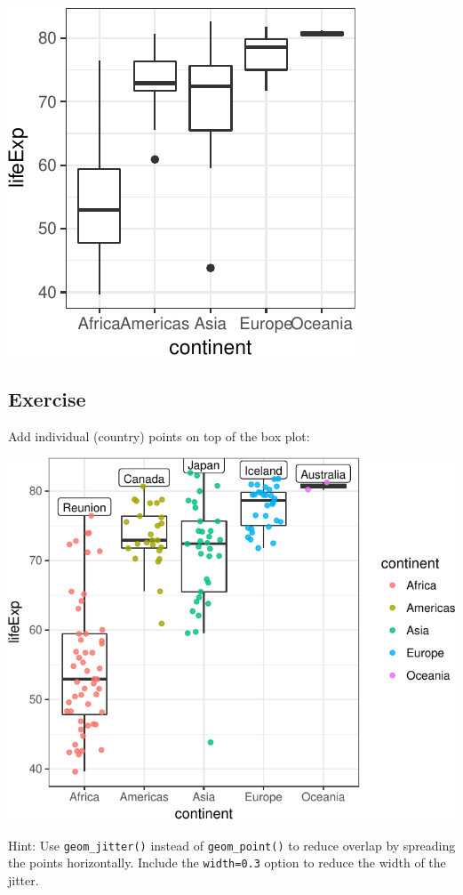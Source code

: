 \documentclass[12pt,]{krantz}
\theoremstyle{definition}
\theoremstyle{definition}
\theoremstyle{definition}
\theoremstyle{remark}
\begin{document}
\includegraphics{04_plotting_files/figure-latex/unnamed-chunk-9-1.pdf}

\hypertarget{exercise-20}{%
\subsection{Exercise}\label{exercise-20}}

Add individual (country) points on top of the box plot:

\includegraphics{04_plotting_files/figure-latex/unnamed-chunk-10-1.pdf}

Hint: Use \texttt{geom\_jitter()} instead of \texttt{geom\_point()} to
reduce overlap by spreading the points horizontally. Include the
\texttt{width=0.3} option to reduce the width of the jitter.
\end{document}
